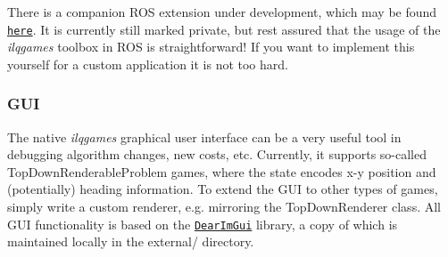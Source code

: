 There is a companion R\+OS extension under development, which may be found \href{https://github.com/HJReachability/ilqgames_ros}{\tt here}. It is currently still marked private, but rest assured that the usage of the {\itshape ilqgames} toolbox in R\+OS is straightforward! If you want to implement this yourself for a custom application it is not too hard.

\subsubsection*{G\+UI}

The native {\itshape ilqgames} graphical user interface can be a very useful tool in debugging algorithm changes, new costs, etc. Currently, it supports so-\/called {\ttfamily Top\+Down\+Renderable\+Problem} games, where the state encodes x-\/y position and (potentially) heading information. To extend the G\+UI to other types of games, simply write a custom renderer, e.\+g. mirroring the {\ttfamily Top\+Down\+Renderer} class. All G\+UI functionality is based on the \href{https://github.com/ocornut/imgui}{\tt Dear\+Im\+Gui} library, a copy of which is maintained locally in the {\ttfamily external/} directory. 